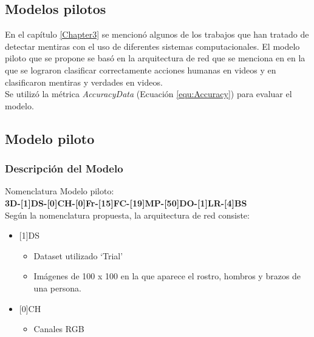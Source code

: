 \begin{onehalfspacing}
\section{Modelos pilotos}
\label{sec:Modelos_pilotos}

En el capítulo \ref{Chapter3} se mencionó algunos de los trabajos que han tratado de detectar mentiras con el uso de diferentes sistemas computacionales. El modelo piloto que se propone se basó en la arquitectura de red que se menciona en  \cite{Ji20133DRecognition} en la que se lograron clasificar correctamente acciones humanas en videos y en \cite{KrishnamurthyADetection} clasificaron mentiras y verdades en videos. \\

Se utilizó la métrica \textit{AccuracyData} (Ecuación \ref{equ:Accuracy}) para evaluar el modelo. 

\subsection{Modelo piloto}
\label{sec:Modelo3D7F}

\subsubsection{Descripción del Modelo}
\label{sec:DescripcionModeloPiloto}

 Nomenclatura Modelo piloto:\\ \textbf{3D-[1]DS-[0]CH-[0]Fr-[15]FC-[19]MP-[50]DO-[1]LR-[4]BS}\\

Según la nomenclatura propuesta, la arquitectura de red consiste:\\

\begin{itemize}
    \item {[1]DS}
        \begin{itemize}
            \item Dataset utilizado `Trial'
            \item Imágenes de 100 x 100 en la que aparece el rostro, hombros y brazos de una persona.
    \end{itemize}
    
    \item {[0]CH}
        \begin{itemize}
            \item Canales RGB
    \end{itemize}


\end{itemize}
\end{onehalfspacing}
